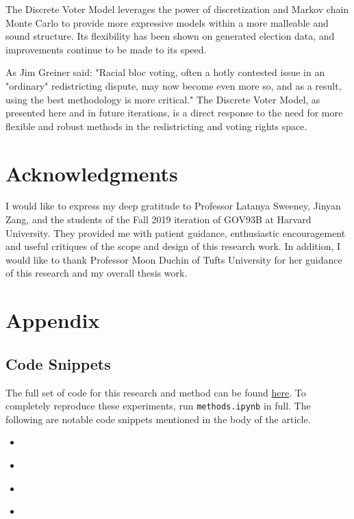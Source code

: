 \documentclass[fleqn,10pt]{style}
\newcommand{\insertcode}[3]{\begin{itemize}\item[]\end{itemize}} %
\begin{document}
The Discrete Voter Model leverages the power of discretization and Markov chain Monte Carlo to provide more expressive models within a more malleable and sound structure. Its flexibility has been shown on generated election data, and improvements continue to be made to its speed.

As Jim Greiner said: "Racial bloc voting, often a hotly contested issue in an "ordinary" redistricting dispute, may now become even more so, and as a result, using the best methodology is more critical."\cite{greiner} The Discrete Voter Model, as presented here and in future iterations, is a direct response to the need for more flexible and robust methods in the redistricting and voting rights space.

\section*{Acknowledgments}

I would like to express my deep gratitude to Professor Latanya Sweeney, Jinyan Zang, and the students of the Fall 2019 iteration of GOV93B at Harvard University. They provided me with patient guidance, enthusiastic encouragement and useful critiques of the scope and design of this research work. In addition, I would like to thank Professor Moon Duchin of Tufts University for her guidance of this research and my overall thesis work.






\onecolumn
{}
\section*{Appendix}
\label{sec:appendix}
\subsection*{Code Snippets}

The full set of code for this research and method can be found \href{https://github.com/hangulu/thesis}{here}. To completely reproduce these experiments, run \texttt{methods.ipynb} in full. The following are notable code snippets mentioned in the body of the article.

\insertcode{"code/ei.py"}{Python Implementation of King's Ecological Inference}{lst:ei_code}

\insertcode{"code/partition.py"}{Integer Partitioning}{lst:integer_partition}

\insertcode{"code/election.py"}{Generate a Random Election}{lst:election}

\insertcode{"code/eval.py"}{Evaluate and Compare DVM and King's EI}{lst:eval}
\end{document}
